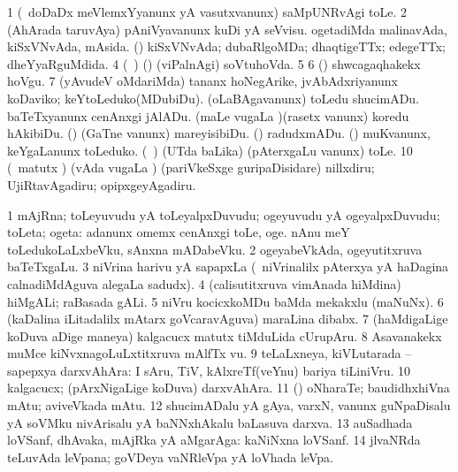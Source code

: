 {\noindent 
\gl{\pagu}
\expl{}
\bmng
\bnum
\num{1}  (\kanmu\ doDaDx meVlemxYyanunx yA vasutxvanunx) saMpUNRvAgi toLe. 
\num{2}  (AhArada taruvAya) pAniVyavanunx kuDi yA seVvisu. 
  
\banum
{} ogetadiMda malinavAda, kiSxVNvAda, mAsida. 
 (\rUpa) kiSxVNvAda; dubaRlgoMDa; dhaqtigeTTx; edegeTTx; dheYyaRguMdida. 
\eanum
\numie
\num{4}  (\kanmu\ \ame) (\ashi) (viPalnAgi) soVtuhoVda. 
\num{5}  
\num{6}  (\sw) shwcagaqhakekx hoVgu. 
\num{7}  (yAvudeV oMdariMda) tananx hoNegArike, jvAbAdxriyanunx koDaviko; keYtoLeduko(MDubiDu). 
  
\banum
{} (oLaBAgavanunx) toLedu shucimADu. 
 baTeTxyanunx cenAnxgi jAlADu. 
 (maLe \mo vugaLa \vi)(rasetx \mo vanunx) koredu hAkibiDu. 
 (\rUpa) (GaTne \mo vanunx) mareyisibiDu. 
 (\AmA) radudxmADu. 
\eanum
\numie
{}  
\banum
{} (\ame) muKvanunx, keYgaLanunx toLeduko. 
 (\kanmu\ \birx) (UTda baLika) (pAterxgaLu \mo vanunx) toLe. 
\eanum
\numie
\num{10}  (\AmA\ matutx \rUpa) (vAda \mo vugaLa \vi) (pariVkeSxge guripaDisidare) nillxdiru; UjiRtavAgadiru; opipxgeyAgadiru. 
\enum
\emng
\eentry

\bentry
{} 
\gl{\nA}
\expl{}
\bmng
\bnum
\num{1} mAjRna; toLeyuvudu yA toLeyalpxDuvudu; ogeyuvudu yA ogeyalpxDuvudu; toLeta; ogeta:  adanunx omemx cenAnxgi toLe, oge.  nAnu meY toLedukoLaLxbeVku, sAnxna mADabeVku. 
\num{2} ogeyabeVkAda, ogeyutitxruva baTeTxgaLu. 
\num{3} niVrina harivu yA sapapxLa (\kanmu\ niVrinalilx pAterxya yA haDagina calnadiMdAguva alegaLa sadudx). 
\num{4} (calisutitxruva vimAnada hiMdina) hiMgALi; raBasada gALi. 
\num{5} niVru kocicxkoMDu baMda mekakxlu (maNuNx). 
\num{6} (kaDalina iLitadalilx mAtarx goVcaravAguva) maraLina dibabx. 
\num{7} (haMdigaLige koDuva aDige maneya) kalgacucx matutx tiMduLida cUrupAru. 
\num{8} Asavanakekx muMce kiNvxnagoLuLxtitxruva mAlfTx \mo vu. 
\num{9} teLaLxneya, kiVLutarada -- sapepxya darxvAhAra:  I sAru, TiV, kAlxreTf(veYnu) bariya tiLiniVru. 
\num{10} kalgacucx; (pArxNigaLige koDuva) darxvAhAra. 
\num{11} (\rUpa) oNharaTe; baudidhxhiVna mAtu; aviveVkada mAtu. 
\num{12} shucimADalu yA gAya, varxN, \mo vanunx guNpaDisalu yA soVMku nivArisalu yA baNNxhAkalu baLasuva darxva. 
\num{13} auSadhada loVSanf, dhAvaka, mAjRka yA aMgarAga:  kaNiNxna loVSanf. 
\num{14} jlvaNRda teLuvAda leVpana; goVDeya vaNRleVpa yA loVhada leVpa. 
\enum
\emng

}
